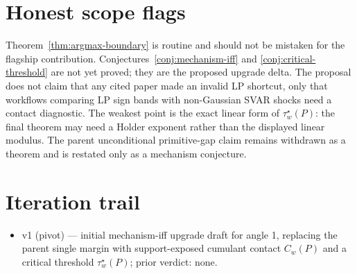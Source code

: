 \documentclass[11pt]{article}
\theoremstyle{definition}
\theoremstyle{plain}
\theoremstyle{remark}
\begin{document}
\section{Honest scope flags}
Theorem~\ref{thm:argmax-boundary} is routine and should not be mistaken for the flagship contribution.  Conjectures~\ref{conj:mechanism-iff} and \ref{conj:critical-threshold} are not yet proved; they are the proposed upgrade delta.  The proposal does not claim that any cited paper made an invalid LP shortcut, only that workflows comparing LP sign bands with non-Gaussian SVAR shocks need a contact diagnostic.  The weakest point is the exact linear form of \(\tau_w^\star(P)\): the final theorem may need a Holder exponent rather than the displayed linear modulus.  The parent unconditional primitive-gap claim remains withdrawn as a theorem and is restated only as a mechanism conjecture.

\section{Iteration trail}
\begin{itemize}[leftmargin=*]
\item v1 (pivot) --- initial mechanism-iff upgrade draft for angle 1, replacing the parent single margin with support-exposed cumulant contact \(C_w(P)\) and a critical threshold \(\tau_w^\star(P)\); prior verdict: none.
\end{itemize}
\end{document}

